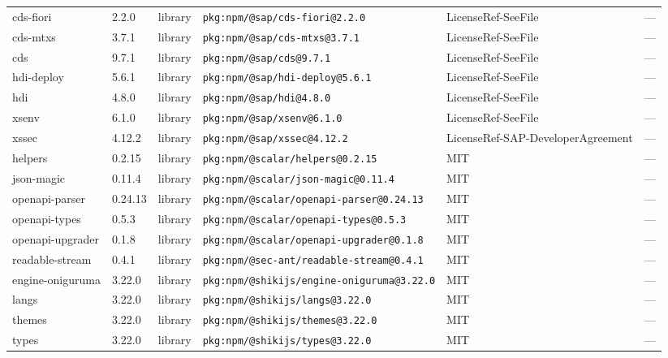 \documentclass[11pt,a4paper]{article}
\begin{document}
\begin{longtable}{|p{4cm}|p{2cm}|p{1.6cm}|p{5cm}|p{1.5cm}|p{3.5cm}|}
\raggedright cds-fiori & 2.2.0 & library & \small\texttt{pkg:npm/@sap/cds-fiori@2.2.0} & LicenseRef-SeeFile & \small — \\
\raggedright cds-mtxs & 3.7.1 & library & \small\texttt{pkg:npm/@sap/cds-mtxs@3.7.1} & LicenseRef-SeeFile & \small — \\
\raggedright cds & 9.7.1 & library & \small\texttt{pkg:npm/@sap/cds@9.7.1} & LicenseRef-SeeFile & \small — \\
\raggedright hdi-deploy & 5.6.1 & library & \small\texttt{pkg:npm/@sap/hdi-deploy@5.6.1} & LicenseRef-SeeFile & \small — \\
\raggedright hdi & 4.8.0 & library & \small\texttt{pkg:npm/@sap/hdi@4.8.0} & LicenseRef-SeeFile & \small — \\
\raggedright xsenv & 6.1.0 & library & \small\texttt{pkg:npm/@sap/xsenv@6.1.0} & LicenseRef-SeeFile & \small — \\
\raggedright xssec & 4.12.2 & library & \small\texttt{pkg:npm/@sap/xssec@4.12.2} & LicenseRef-SAP-DeveloperAgreement & \small — \\
\raggedright helpers & 0.2.15 & library & \small\texttt{pkg:npm/@scalar/helpers@0.2.15} & MIT & \small — \\
\raggedright json-magic & 0.11.4 & library & \small\texttt{pkg:npm/@scalar/json-magic@0.11.4} & MIT & \small — \\
\raggedright openapi-parser & 0.24.13 & library & \small\texttt{pkg:npm/@scalar/openapi-parser@0.24.13} & MIT & \small — \\
\raggedright openapi-types & 0.5.3 & library & \small\texttt{pkg:npm/@scalar/openapi-types@0.5.3} & MIT & \small — \\
\raggedright openapi-upgrader & 0.1.8 & library & \small\texttt{pkg:npm/@scalar/openapi-upgrader@0.1.8} & MIT & \small — \\
\raggedright readable-stream & 0.4.1 & library & \small\texttt{pkg:npm/@sec-ant/readable-stream@0.4.1} & MIT & \small — \\
\raggedright engine-oniguruma & 3.22.0 & library & \small\texttt{pkg:npm/@shikijs/engine-oniguruma@3.22.0} & MIT & \small — \\
\raggedright langs & 3.22.0 & library & \small\texttt{pkg:npm/@shikijs/langs@3.22.0} & MIT & \small — \\
\raggedright themes & 3.22.0 & library & \small\texttt{pkg:npm/@shikijs/themes@3.22.0} & MIT & \small — \\
\raggedright types & 3.22.0 & library & \small\texttt{pkg:npm/@shikijs/types@3.22.0} & MIT & \small — \\

\end{longtable}
\end{document}
